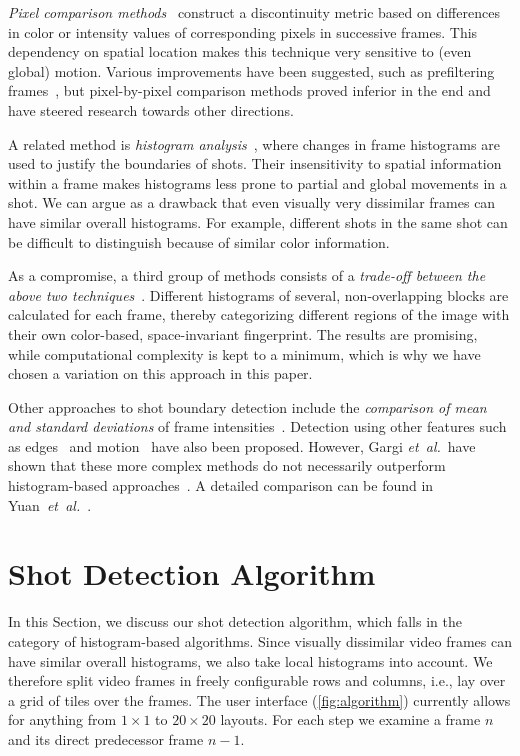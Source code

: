 \documentclass{acm_proc_article-sp}
\begin{document}
\emph{Pixel comparison methods}~\cite{Hampapur1994, Zhang1993} construct a discontinuity metric based on differences in color or intensity values of corresponding pixels in successive frames. This dependency on spatial location makes this technique very sensitive to (even global) motion. Various improvements have been suggested, such as prefiltering frames~\cite{Zhang1995}, but pixel-by-pixel comparison methods proved inferior in the end and have steered research towards other directions.

A related method is \emph{histogram analysis}~\cite{Smeaton1999}, where changes in frame histograms are used to justify the boundaries of shots. Their insensitivity to spatial information within a frame makes histograms less prone to partial and global movements in a shot. We can argue as a drawback that even visually very dissimilar frames can have similar overall histograms. For example, different shots in the same shot can be difficult to distinguish because of similar color information.

As a compromise, a third group of methods consists of a \emph{trade-off between the above two techniques}~\cite{Ahmed1999}. Different histograms of several, non-overlapping blocks are calculated for each frame, thereby categorizing different regions of the image with their own color-based, space-invariant fingerprint. The results are promising, while computational complexity is kept to a minimum, which is why we have chosen a variation on this approach in this paper.

Other approaches to shot boundary detection include the \emph{comparison of mean and standard deviations} of frame intensities~\cite{Lienhart1999}. Detection using other features such as edges~\cite{Zabih1995} and motion~\cite{Bouthemy1997} have also been proposed. However, Gargi \emph{et~al.}\ have shown that these more complex methods do not necessarily outperform histogram-based approaches~\cite{Gargi2000}. A detailed comparison can be found in Yuan~\emph{et~al.}~\cite{Yuan2007}. 

\section{Shot Detection Algorithm} \label{sec:details-of-algo}
In this Section, we discuss our shot detection algorithm, which falls in the category of histogram-based algorithms.  Since visually dissimilar video frames can have similar overall histograms, we also take local histograms into account. 
We therefore split video frames in freely configurable rows and columns, i.e., lay over a grid of tiles over the frames. The user interface (\autoref{fig:algorithm}) currently allows for anything from $\mathit{1} \times \mathit{1}$ to $\mathit{20} \times \mathit{20}$ layouts. For each step we examine a frame $\mathit{n}$ and its direct predecessor frame $\mathit{n - 1}$.
\end{document}
